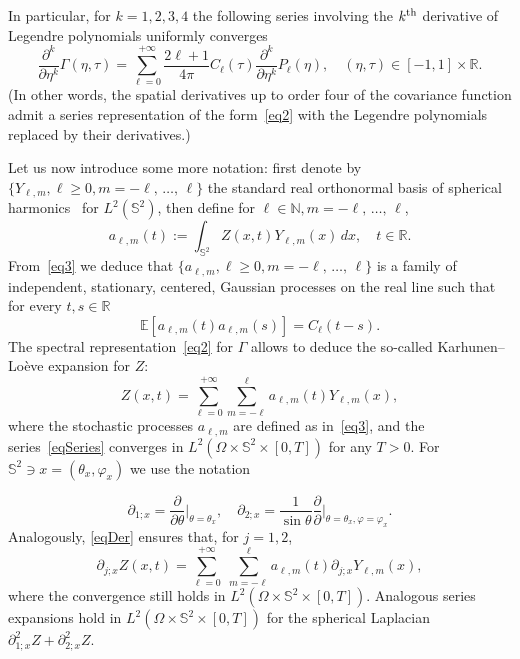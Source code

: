 \documentclass[AHL,Unicode,longabstracts,published]{cedram}
\newcommand{\bbS}{\mathbb{S}}
\newcommand{\bbR}{\mathbb{R}}
\newcommand{\bbE}{\mathbb{E}}
\newcommand{\bbN}{\mathbb{N}}
\begin{document}
In particular, for $k=1,2,3,4$ the following series involving the $k^{\rm th}$ derivative of Legendre polynomials uniformly converges
\begin{equation}\label{eqDer}
\frac{\partial^k}{\partial \eta^k}\Gamma(\eta, \tau)= \sum_{\ell=0}^{+\infty}
\frac{2\ell+1}{4\pi} C_\ell(\tau) \frac{\partial^k}{\partial \eta^k} P_\ell(\eta),\quad (\eta, \tau) \in [-1,1] \times \bbR.
\end{equation}
(In other words, the spatial derivatives up to order four of the covariance function admit a series representation of the form~\eqref{eq2} with the Legendre polynomials replaced by their derivatives.)



Let us now introduce some more notation: first denote by $\{ Y_{\ell,m}, \ell \ge 0, m=-\ell,\, \dots,\, \ell\}$ the standard real orthonormal basis of spherical harmonics~\cite[Section~3.4]{MaPeCUP} for $ L^2(\bbS^2)$, then define for $\ell\in \bbN, m=-\ell,\,\dots,\,\ell$,
\begin{equation}\label{eq3}
a_{\ell,m}(t) := \int_{\bbS^2} Z(x,t) Y_{\ell,m}(x)\,dx,\quad t\in
\bbR.
\end{equation}
From~\eqref{eq3} we deduce that $\{ a_{\ell,m}, \ell \ge 0, m=-\ell,\,
\dots,\,\ell\}$ is a family of independent, stationary, centered, Gaussian processes on the real line such that for every $t,s \in \bbR$
\begin{equation*}
\bbE[a_{\ell,m}(t) a_{\ell,m}(s)] = C_\ell(t-s).
\end{equation*}
The spectral representation~\eqref{eq2} for $\Gamma$ allows to deduce the so-called Karhunen--Lo\`eve expansion for $Z$:
\begin{equation}\label{eqSeries}
Z(x,t) = \sum_{\ell =0}^{+\infty} \sum_{m=-\ell}^\ell a_{\ell,m}(t) Y_{\ell,m}(x),
\end{equation}
where the stochastic processes $a_{\ell,m}$ are defined as in~\eqref{eq3}, and the series~\eqref{eqSeries} converges in $L^2(\Omega \times \bbS^2
\times [0,T])$ for any $T>0$. For $\bbS^2\ni x=(\theta_x, \varphi_x)$ we use the notation

\begin{equation*}
\partial_{1;x} = \frac{\partial}{\partial \theta}\bigg|_{\theta=\theta_x},\quad
\partial_{2;x}= \frac{1}{\sin\theta}\frac{\partial}{\partial}\bigg|_{\theta=\theta_x, \varphi=\varphi_x}.
\end{equation*}
Analogously, \eqref{eqDer} ensures that, for $j=1,2$,
\begin{equation}\label{eqSeries_gradient}
\partial_{j;x} Z(x,t) = \sum_{\ell =0}^{+\infty}\;\sum_{m=-\ell}^\ell a_{\ell,m}(t) \partial_{j;x} Y_{\ell,m}(x),
\end{equation}
where the convergence still holds in $L^2(\Omega \times \bbS^2 \times [0,T])$. Analogous series expansions hold in $L^2(\Omega \times \bbS^2 \times [0,T])$ for the spherical Laplacian $\partial^2_{1;x} Z + \partial^2_{2;x}Z$.
\end{document}
